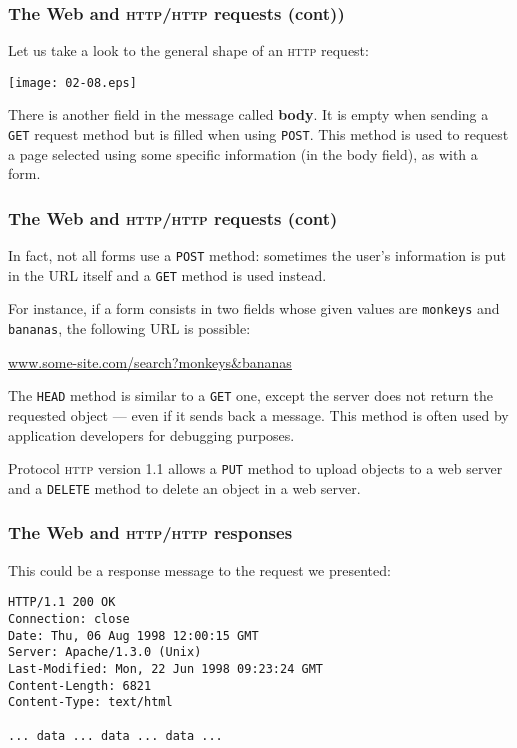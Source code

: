 %
\begin{frame}[containsverbatim]
\frametitle{The Web and \textsc{http}/\textsc{http} requests (cont))}

Let us take a look to the general shape of an
\textsc{http} request:
\begin{center}
\texttt{[image: 02-08.eps]}
\end{center}
There is another field in the message called \textbf{body}. It is
empty when sending a \verb+GET+ request method but is filled when
using \verb+POST+. This method is used to request a page selected
using some specific information (in the body field), as with a form.

\end{frame}

%
\begin{frame}[containsverbatim]
\frametitle{The Web and \textsc{http}/\textsc{http} requests (cont)}

In fact, not all forms use a \verb+POST+ method: sometimes the user's
information is put in the URL itself and a \verb+GET+ method is used
instead. 

For instance, if a form consists in two fields whose given values are
\texttt{monkeys} and \texttt{bananas}, the following URL is possible:
\begin{center}
\url{www.some-site.com/search?monkeys&bananas}
\end{center}

The \verb+HEAD+ method is similar to a \verb+GET+ one, except the
server does not return the requested object --- even if it sends back
a message. This method is often used by application developers for
debugging purposes.

Protocol \textsc{http} version 1.1 allows a \verb+PUT+ method to
upload objects to a web server and a \verb+DELETE+ method to delete an
object in a web server.

\end{frame}

%
\begin{frame}[containsverbatim]
\frametitle{The Web and \textsc{http}/\textsc{http} responses}

This could be a response message to the request we presented:
{\small
\begin{verbatim}
HTTP/1.1 200 OK
Connection: close
Date: Thu, 06 Aug 1998 12:00:15 GMT
Server: Apache/1.3.0 (Unix)
Last-Modified: Mon, 22 Jun 1998 09:23:24 GMT
Content-Length: 6821
Content-Type: text/html

... data ... data ... data ...
\end{verbatim}
}

\end{frame}

